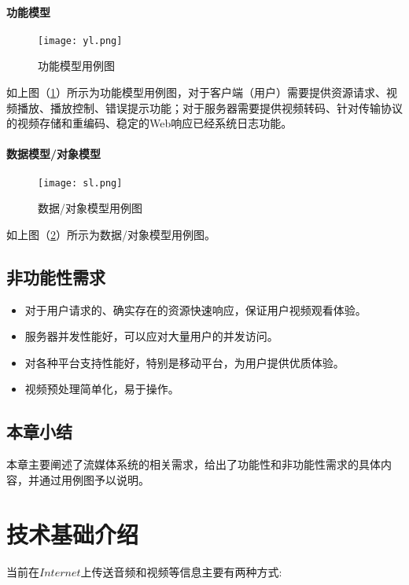 \documentclass[bachelor]{thesis-uestc}
\begin{document}
\subsubsection{功能模型}

\begin{figure}[h]
\texttt{[image: yl.png]}
\caption{功能模型用例图}
\label{yl} 
\end{figure}

如上图（\ref{yl}）所示为功能模型用例图，对于客户端（用户）需要提供资源请求、视频播放、播放控制、错误提示功能；对于服务器需要提供视频转码、针对传输协议的视频存储和重编码、稳定的Web响应已经系统日志功能。


\subsubsection{数据模型/对象模型}

\begin{figure}[h]
\texttt{[image: sl.png]}
\caption{数据/对象模型用例图}
\label{sl} 
\end{figure}

如上图（\ref{sl}）所示为数据/对象模型用例图。


\section{非功能性需求}

\begin{itemize}
	\item 对于用户请求的、确实存在的资源快速响应，保证用户视频观看体验。
	\item 服务器并发性能好，可以应对大量用户的并发访问。
	\item 对各种平台支持性能好，特别是移动平台，为用户提供优质体验。
	\item 视频预处理简单化，易于操作。
\end{itemize}

\section{本章小结}
本章主要阐述了流媒体系统的相关需求，给出了功能性和非功能性需求的具体内容，并通过用例图予以说明。

\chapter{技术基础介绍}

当前在$Internet$上传送音频和视频等信息主要有两种方式:
\end{document}
